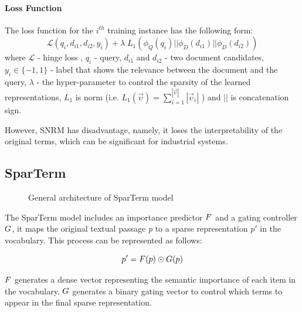 \documentclass[
    twocolumn,
]{ceurart}
\begin{document}
    \paragraph{Loss Function}
    The loss function for the $i^{th}$ training instance has the following form:
    \begin{equation}
        \mathcal{L}(q_i,d_{i1},d_{i2},y_i) + \lambda\;L_1(\phi_Q(q_i)||\phi_D(d_{i1})||\phi_D(d_{i2}))
    \end{equation}
    where $\mathcal{L}$ - hinge loss \cite{IRNLP}, $q_i$ - query, $d_{i1}$ and $d_{i2}$ - two
    document candidates, $y_i \in \{-1, 1\}$ - label that shows the relevance between the document
    and the query, $\lambda$ - the hyper-parameter to control the sparsity of the learned
    representations, $L_1$ is norm (i.e.
    \begin{math}
        L_1(\vec{\upsilon}) = \sum_{i=1}^{|\vec{\upsilon}|}|\vec{\upsilon}_i|
    \end{math}
    ) and $||$ is concatenation sign.\\\par

    However, SNRM has disadvantage, namely, it loses the interpretability of the original terms,
    which can be significant for industrial systems.

    \subsection{SparTerm}

    \begin{figure}[h]
        \centering
        \def\svgwidth{\columnwidth}
        
        \caption{General architecture of SparTerm model}
    \end{figure}
    The SparTerm model includes an importance predictor $\mathnormal{F}$ and a gating controller
    $\mathnormal{G}$, it maps the original textual passage \emph{p} to a sparse representation
    $p'$ in the vocabulary.
    This process can be represented as follows:

    \begin{equation}
        \label{eqn:sparterm:mapping-process}
        p' = \mathnormal{F}(p) \odot \mathnormal{G}(p)
    \end{equation}

    $\mathnormal{F}$ generates a dense vector representing the semantic importance of each item
    in the vocabulary. $\mathnormal{G}$ generates a binary gating vector to control which terms
    to appear in the final sparse representation.
\end{document}
